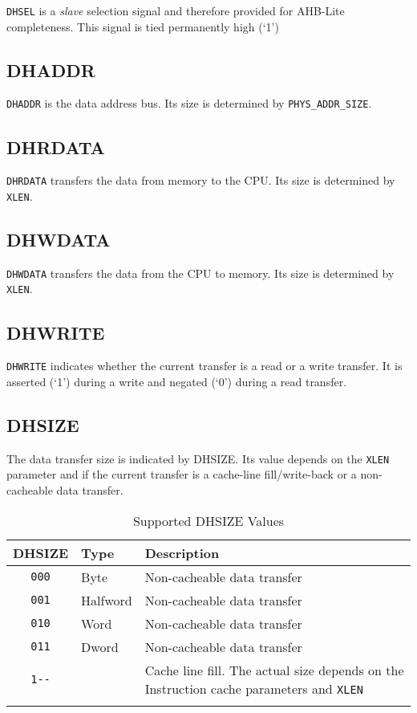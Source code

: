 \texttt{DHSEL} is a \emph{slave} selection signal and therefore provided for AHB-Lite
completeness. This signal is tied permanently high (`1')

\subsection{DHADDR}\label{dhaddr}

\texttt{DHADDR} is the data address bus. Its size is determined by
\texttt{PHYS\_ADDR\_SIZE}.

\subsection{DHRDATA}\label{dhrdata}

\texttt{DHRDATA} transfers the data from memory to the CPU. Its size is
determined by \texttt{XLEN}.

\subsection{DHWDATA}\label{dhwdata}

\texttt{DHWDATA} transfers the data from the CPU to memory. Its size is
determined by \texttt{XLEN}.

\subsection{DHWRITE}\label{dhwrite}

\texttt{DHWRITE} indicates whether the current transfer is a read or a write
transfer. It is asserted (`1') during a write and negated (`0') during a
read transfer.

\subsection{DHSIZE}\label{dhsize}

The data transfer size is indicated by DHSIZE. Its value depends on the
\texttt{XLEN} parameter and if the current transfer is a cache-line
fill/write-back or a non-cacheable data transfer.

\begin{longtable}[]{@{}clp{7.5cm}@{}}
\toprule
DHSIZE & Type & Description\tabularnewline
\midrule
\endhead
\texttt{000} & Byte & Non-cacheable data transfer\tabularnewline
\texttt{001} & Halfword & Non-cacheable data transfer\tabularnewline
\texttt{010} & Word & Non-cacheable data transfer\tabularnewline
\texttt{011} & Dword & Non-cacheable data transfer\tabularnewline
\texttt{1-\/-} & & Cache line fill. The actual size depends on the Instruction
cache parameters and \texttt{XLEN}\tabularnewline
\bottomrule
\caption{Supported DHSIZE Values}
\label{tab:dhsize-values}
\end{longtable}

